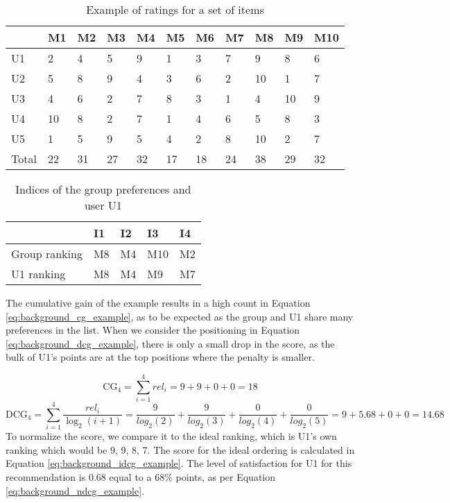 \begin{table}[H]
	\centering
	\begin{tabular}{|l|l|l|l|l|l|l|l|l|l|l|}
		\hline
		& M1 & M2 & M3 & M4 & M5 & M6 & M7 & M8 & M9 & M10 \\ \hline
		U1    & 2  & 4  & 5  & 9  & 1  & 3  & 7  & 9  & 8  & 6   \\ \hline
		U2    & 5  & 8  & 9  & 4  & 3  & 6  & 2  & 10 & 1  & 7   \\ \hline
		U3    & 4  & 6  & 2  & 7  & 8  & 3  & 1  & 4  & 10 & 9   \\ \hline
		U4    & 10 & 8  & 2  & 7  & 1  & 4  & 6  & 5  & 8  & 3   \\ \hline
		U5    & 1  & 5  & 9  & 5  & 4  & 2  & 8  & 10 & 2  & 7   \\ \hline
		Total & 22 & 31 & 27 & 32 & 17 & 18 & 24 & 38 & 29 & 32  \\ \hline
	\end{tabular}
	\caption{Example of ratings for a set of items}
	\label{tbl:testandeval_bordacount}
\end{table}

\begin{table}[H]
	\centering
	\begin{tabular}{|l|l|l|l|l|}
		\hline
		& I1 & I2 & I3  & I4 \\ \hline
		Group ranking & M8 & M4 & M10 & M2 \\ \hline
		U1 ranking    & M8 & M4 & M9  & M7 \\ \hline
	\end{tabular}
	\caption{Indices of the group preferences and user U1}
	\label{tbl:testandeval_positions}
\end{table}

The cumulative gain of the example results in a high count in Equation \ref{eq:background_cg_example}, as to be expected as the group and U1 share many preferences in the list. When we consider the positioning in Equation \ref{eq:background_dcg_example}, there is only a small drop in the score, as the bulk of U1's points are at the top positions where the penalty is smaller.

\begin{equation}\label{eq:background_cg_example}
\text{CG}_4 = \sum_{i=1}^{4}\textit{rel}_i = 9 + 9 + 0 + 0 = 18
\end{equation}
\footnotesize
\begin{equation}\label{eq:background_dcg_example}
\text{DCG}_4 = \sum_{i=1}^{4}\frac{\textit{rel}_i}{\log_2(i + 1)}
= \frac{9}{log_2(2)} + \frac{9}{log_2(3)} + \frac{0}{log_2(4)} + \frac{0}{log_2(5)} =9 + 5.68 + 0 + 0 = 14.68
\end{equation}
\normalsize
To normalize the score, we compare it to the ideal ranking, which is U1's own ranking which would be 9, 9, 8, 7. The score for the ideal ordering is calculated in Equation \ref{eq:background_idcg_example}. The level of satisfaction for U1 for this recommendation is $0.68$ equal to a 68\% points, as per Equation \ref{eq:background_ndcg_example}. 

